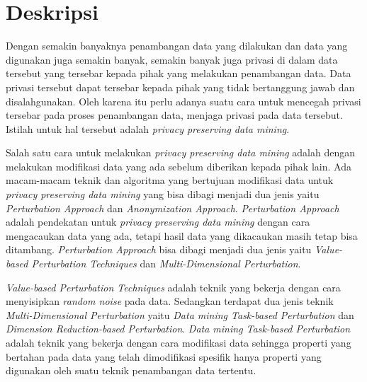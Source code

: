 \documentclass[a4paper,twoside]{article}
\begin{document}
\title{\@judultopik}
\author{\nama \textendash \@npm} 

\newcommand{\nama}{Chris Eldon}
\newcommand{\@npm}{2016730073}
\newcommand{\@judultopik}{Privacy Preserving Data Mining dengan Metode Randomization} %
\newcommand{\jumpemb}{1} %
\newcommand{\tanggal}{27/08/2019}


\maketitle


\section{Deskripsi}
Dengan semakin banyaknya penambangan data yang dilakukan dan data yang digunakan juga semakin banyak, semakin banyak juga privasi di dalam data tersebut yang tersebar kepada pihak yang melakukan penambangan data. Data privasi tersebut dapat tersebar kepada pihak yang tidak bertanggung jawab dan disalahgunakan. Oleh karena itu perlu adanya suatu cara untuk mencegah privasi tersebar pada proses penambangan data, menjaga privasi pada data tersebut. Istilah untuk hal tersebut adalah \textit{privacy preserving data mining}.

Salah satu cara untuk melakukan \textit{privacy preserving data mining} adalah dengan melakukan modifikasi data yang ada sebelum diberikan kepada pihak lain. Ada macam-macam teknik dan algoritma yang bertujuan modifikasi data untuk \textit{privacy preserving data mining} yang bisa dibagi menjadi dua jenis yaitu \textit{Perturbation Approach} dan \textit{Anonymization Approach}. \textit{Perturbation Approach} adalah pendekatan untuk \textit{privacy preserving data mining} dengan cara mengacaukan data yang ada, tetapi hasil data yang dikacaukan masih tetap bisa ditambang. \textit{Perturbation Approach} bisa dibagi menjadi dua jenis yaitu \textit{Value-based Perturbation Techniques} dan \textit{Multi-Dimensional Perturbation}.

\textit{Value-based Perturbation Techniques} adalah teknik yang bekerja dengan cara menyisipkan \textit{random noise} pada data. Sedangkan terdapat dua jenis teknik \textit{Multi-Dimensional Perturbation} yaitu \textit{Data mining Task-based Perturbation} dan \textit{Dimension Reduction-based Perturbation}. \textit{Data mining Task-based Perturbation} adalah teknik yang bekerja dengan cara modifikasi data sehingga properti yang bertahan pada data yang telah dimodifikasi spesifik hanya properti yang digunakan oleh suatu teknik penambangan data tertentu.
\end{document}
